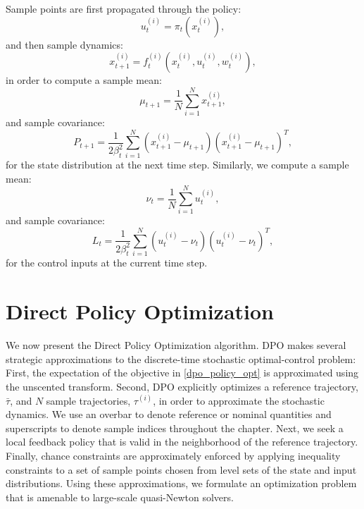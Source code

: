 Sample points are first propagated through the policy:
\begin{equation}
	u_t^{(i)} = \pi_t(x_t^{(i)}), \label{dpo_sample_propagate_control}
\end{equation}
and then sample dynamics:
\begin{equation}
	x_{t+1}^{(i)} = f_t^{(i)}(x_t^{(i)}, u_t^{(i)}, w_t^{(i)}), \label{dpo_sample_propagate}
\end{equation}
in order to compute a sample mean:
\begin{equation}
	\mu_{t+1} = \frac{1}{N} \sum\limits_{i=1}^{N} x_{t+1}^{(i)}, \label{dpo_sample_mean}
\end{equation}
and sample covariance:
\begin{equation}
	P_{t+1} = \frac{1}{2 \beta_t^2}\sum\limits_{i=1}^{N} (x_{t+1}^{(i)} - \mu_{t+1})(x_{t+1}^{(i)} - \mu_{t+1})^T, \label{dpo_sample_covariance}
\end{equation}
for the state distribution at the next time step. Similarly, we compute a sample mean:
\begin{equation}
	\nu_t = \frac{1}{N} \sum\limits_{i=1}^{N} u_t^{(i)}, \label{dpo_sample_mean_control}
\end{equation}
and sample covariance:
\begin{equation}
	L_t = \frac{1}{2 \beta_t^2}\sum\limits_{i=1}^{N} (u_t^{(i)} - \nu_t)(u_t^{(i)} - \nu_t)^T, \label{dpo_sample_covariance_control}
\end{equation}
for the control inputs at the current time step.

\section{Direct Policy Optimization}\label{DPO}
We now present the Direct Policy Optimization algorithm. DPO makes several strategic approximations to the discrete-time stochastic optimal-control problem: First, the expectation of the objective in \eqref{dpo_policy_opt} is approximated using the unscented transform. Second, DPO explicitly optimizes a reference trajectory, $\bar{\tau}$, and $N$ sample trajectories, $\tau^{(i)}$, in order to approximate the stochastic dynamics. We use an overbar to denote reference or nominal quantities and superscripts to denote sample indices throughout the chapter. Next, we seek a local feedback policy that is valid in the neighborhood of the reference trajectory. Finally, chance constraints are approximately enforced by applying inequality constraints to a set of sample points chosen from level sets of the state and input distributions. Using these approximations, we formulate an optimization problem that is amenable to large-scale quasi-Newton solvers.

